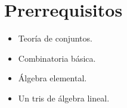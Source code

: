 \part*{Prerrequisitos}

\begin{itemize}
  \item Teoría de conjuntos.
  \item Combinatoria básica.
  \item Álgebra elemental.
  \item Un tris de álgebra lineal.
\end{itemize}

